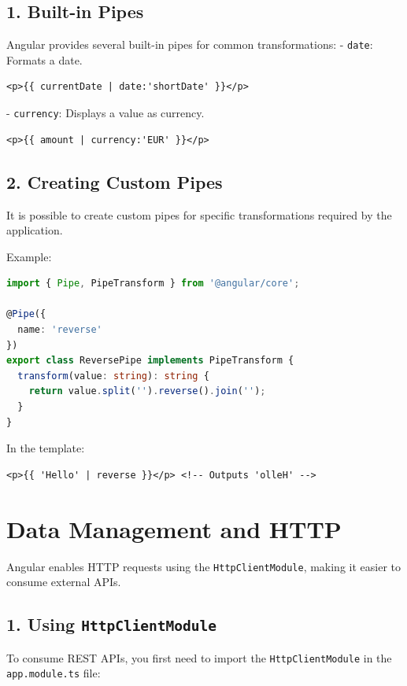 \documentclass{article}
\begin{document}
\subsection*{1. Built-in Pipes}

Angular provides several built-in pipes for common transformations:
- \texttt{date}: Formats a date.
\begin{verbatim}
<p>{{ currentDate | date:'shortDate' }}</p>
\end{verbatim}

- \texttt{currency}: Displays a value as currency.
\begin{verbatim}
<p>{{ amount | currency:'EUR' }}</p>
\end{verbatim}

\subsection*{2. Creating Custom Pipes}

It is possible to create custom pipes for specific transformations required by the application.

Example:
\begin{lstlisting}[language=TypeScript, caption={Custom Pipe Example}, label={lst:custom-pipe}]
import { Pipe, PipeTransform } from '@angular/core';

@Pipe({
  name: 'reverse'
})
export class ReversePipe implements PipeTransform {
  transform(value: string): string {
    return value.split('').reverse().join('');
  }
}
\end{lstlisting}

In the template:
\begin{verbatim}
<p>{{ 'Hello' | reverse }}</p> <!-- Outputs 'olleH' -->
\end{verbatim}
\section*{Data Management and HTTP}

Angular enables HTTP requests using the \texttt{HttpClientModule}, making it easier to consume external APIs.

\subsection*{1. Using \texttt{HttpClientModule}}

To consume REST APIs, you first need to import the \texttt{HttpClientModule} in the \texttt{app.module.ts} file:
\end{document}
